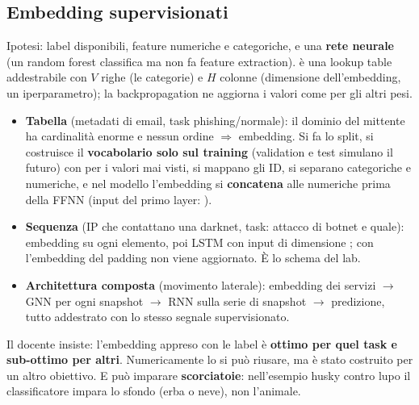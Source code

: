 \subsection{Embedding supervisionati}
Ipotesi: label disponibili, feature numeriche e categoriche, e una \textbf{rete neurale} (un random forest
classifica ma non fa feature extraction).  è una lookup table addestrabile con $V$
righe (le categorie) e $H$ colonne (dimensione dell'embedding, un iperparametro); la backpropagation ne
aggiorna i valori come per gli altri pesi.
\begin{itemize}
  \item \textbf{Tabella} (metadati di email, task phishing/normale): il dominio del mittente ha cardinalità
    enorme e nessun ordine $\Rightarrow$ embedding. Si fa lo split, si costruisce il \textbf{vocabolario
    solo sul training} (validation e test simulano il futuro) con  per i valori mai visti, si
    mappano gli ID, si separano categoriche e numeriche, e nel modello l'embedding si \textbf{concatena}
    alle numeriche prima della FFNN (input del primo layer: ).
  \item \textbf{Sequenza} (IP che contattano una darknet, task: attacco di botnet e quale): embedding su
    ogni elemento, poi LSTM con input di dimensione ; con  l'embedding
    del padding non viene aggiornato. È lo schema del lab.
  \item \textbf{Architettura composta} (movimento laterale): embedding dei servizi $\to$ GNN per ogni
    snapshot $\to$ RNN sulla serie di snapshot $\to$ predizione, tutto addestrato con lo stesso segnale
    supervisionato.
\end{itemize}

\begin{esame}
Il docente insiste: l'embedding appreso con le label è \textbf{ottimo per quel task e sub-ottimo per
altri}. Numericamente lo si può riusare, ma è stato costruito per un altro obiettivo. E può imparare
\textbf{scorciatoie}: nell'esempio husky contro lupo il classificatore impara lo sfondo (erba o neve),
non l'animale.
\end{esame}

